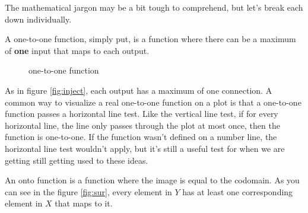The mathematical jargon may be a bit tough to comprehend, but let's break each down individually. 

A one-to-one function, simply put, is a function where there can be a maximum of \textbf{one} input that maps to each output. 
\begin{figure}[h]
\centering
{}
	\caption{one-to-one function}
	\label{fig:inject}
\end{figure}
As in figure \eqref{fig:inject}, each output has a maximum of one connection.
A common way to visualize a real one-to-one function on a plot is that a one-to-one function passes a horizontal line test. 
Like the vertical line test, if for every horizontal line, the line only passes through the plot at most once, then the function is one-to-one. If the function wasn't defined on a number line, the horizontal line test wouldn't apply, but it's still a useful test for when we are getting still getting used to these ideas.

An onto function is a function where the image is equal to the codomain. As you can see in the figure \eqref{fig:sur}, every element in $Y$ has at least one corresponding element in $X$ that maps to it. 

